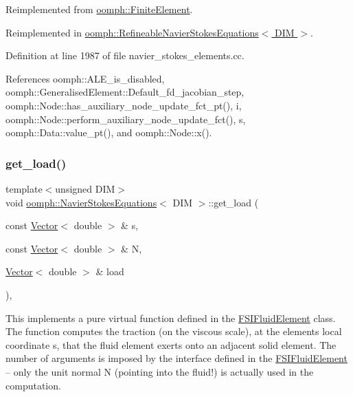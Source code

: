 Reimplemented from \hyperlink{classoomph_1_1FiniteElement_ae4b85a31a983a52d3010930f9e0851b8}{oomph\+::\+Finite\+Element}.



Reimplemented in \hyperlink{classoomph_1_1RefineableNavierStokesEquations_ac88134acd65f21845e5fc8e83b89c74a}{oomph\+::\+Refineable\+Navier\+Stokes\+Equations$<$ D\+I\+M $>$}.



Definition at line 1987 of file navier\+\_\+stokes\+\_\+elements.\+cc.



References oomph\+::\+A\+L\+E\+\_\+is\+\_\+disabled, oomph\+::\+Generalised\+Element\+::\+Default\+\_\+fd\+\_\+jacobian\+\_\+step, oomph\+::\+Node\+::has\+\_\+auxiliary\+\_\+node\+\_\+update\+\_\+fct\+\_\+pt(), i, oomph\+::\+Node\+::perform\+\_\+auxiliary\+\_\+node\+\_\+update\+\_\+fct(), s, oomph\+::\+Data\+::value\+\_\+pt(), and oomph\+::\+Node\+::x().

\mbox{\label{classoomph_1_1NavierStokesEquations_af2e10e52fc3a54b580e330fd763aa9f5}} 
\subsubsection{\texorpdfstring{get\+\_\+load()}{get\_load()}}
{\footnotesize\ttfamily template$<$unsigned D\+IM$>$ \\
void \hyperlink{classoomph_1_1NavierStokesEquations}{oomph\+::\+Navier\+Stokes\+Equations}$<$ D\+IM $>$\+::get\+\_\+load (\begin{DoxyParamCaption}\item[{const \hyperlink{classoomph_1_1Vector}{Vector}$<$ double $>$ \&}]{s,  }\item[{const \hyperlink{classoomph_1_1Vector}{Vector}$<$ double $>$ \&}]{N,  }\item[{\hyperlink{classoomph_1_1Vector}{Vector}$<$ double $>$ \&}]{load }\end{DoxyParamCaption})\hspace{0.3cm}{\ttfamily [inline]}, {\ttfamily [virtual]}}



This implements a pure virtual function defined in the \hyperlink{classoomph_1_1FSIFluidElement}{F\+S\+I\+Fluid\+Element} class. The function computes the traction (on the viscous scale), at the element\textquotesingle{}s local coordinate s, that the fluid element exerts onto an adjacent solid element. The number of arguments is imposed by the interface defined in the \hyperlink{classoomph_1_1FSIFluidElement}{F\+S\+I\+Fluid\+Element} -- only the unit normal N (pointing into the fluid!) is actually used in the computation. 



